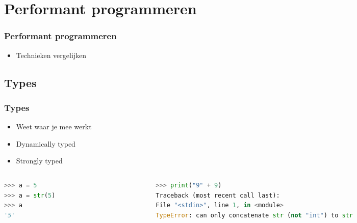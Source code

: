 \documentclass[aspectratio=169]{beamer}
\begin{document}
\section{Performant programmeren}
\begin{frame}[fragile]
  \frametitle{Performant programmeren}
  \begin{itemize}
    \item Technieken vergelijken
  \end{itemize}
\end{frame}

\subsection{Types}
\begin{frame}[fragile]
  \frametitle{Types}
  \begin{itemize}
    \item Weet waar je mee werkt
    \item Dynamically typed
    \item Strongly typed
  \end{itemize}
  \medskip
  \begin{columns}
    \begin{column}{0.3\textwidth}
      \begin{lstlisting}[language=Python]
>>> a = 5
>>> a = str(5)
>>> a
'5'
      \end{lstlisting}
    \end{column}
    \begin{column}{0.7\textwidth}
      \begin{lstlisting}[language=Python]
>>> print("9" + 9)
Traceback (most recent call last):
File "<stdin>", line 1, in <module>
TypeError: can only concatenate str (not "int") to str
      \end{lstlisting}
    \end{column}
  \end{columns}
\end{frame}

\end{document}
